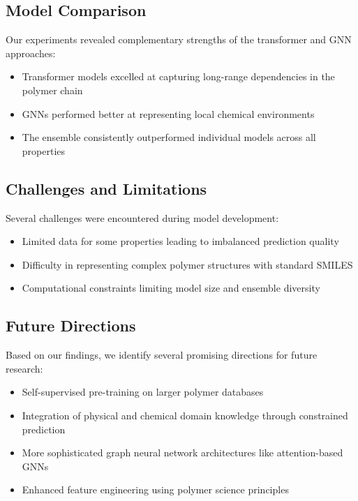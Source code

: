 \documentclass[10pt,twocolumn,letterpaper]{article}
\begin{document}
\subsection{Model Comparison}

Our experiments revealed complementary strengths of the transformer and GNN approaches:
\begin{itemize}
    \item Transformer models excelled at capturing long-range dependencies in the polymer chain
    \item GNNs performed better at representing local chemical environments
    \item The ensemble consistently outperformed individual models across all properties
\end{itemize}

\subsection{Challenges and Limitations}

Several challenges were encountered during model development:
\begin{itemize}
    \item Limited data for some properties leading to imbalanced prediction quality
    \item Difficulty in representing complex polymer structures with standard SMILES
    \item Computational constraints limiting model size and ensemble diversity
\end{itemize}

\subsection{Future Directions}

Based on our findings, we identify several promising directions for future research:
\begin{itemize}
    \item Self-supervised pre-training on larger polymer databases
    \item Integration of physical and chemical domain knowledge through constrained prediction
    \item More sophisticated graph neural network architectures like attention-based GNNs
    \item Enhanced feature engineering using polymer science principles
\end{itemize}
\end{document}
